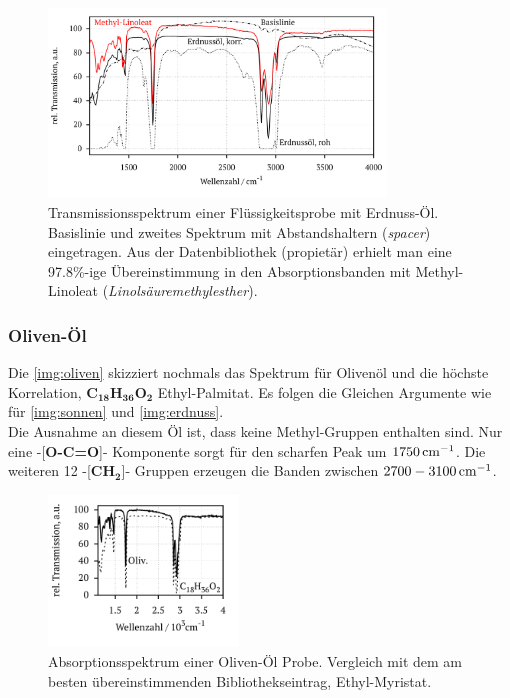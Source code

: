 \documentclass[a4paper,10pt,twocolumn]{article}
\newcommand{\tilt}[1]{\textit{#1}}
\newcommand{\fett}[1]{\textbf{#1}}
\begin{document}
			\begin{figure}
				\centering
				\includegraphics[width=0.8\textwidth]{Gruppe2A/erdnuss.pdf}
				\caption{Transmissionsspektrum einer Fl\"ussigkeitsprobe mit Erdnuss-\"Ol. Basislinie und zweites Spektrum mit Abstandshaltern (\tilt{spacer}) eingetragen. Aus der Datenbibliothek (propiet\"ar) erhielt man eine 97.8\%-ige \"Ubereinstimmung in den Absorptionsbanden mit Methyl-Linoleat (\tilt{Linols\"auremethylesther}).} 
				\label{img:erdnuss}
			\end{figure}

	\newpage

		\subsubsection*{Oliven-\"Ol}

		Die \autoref{img:oliven} skizziert nochmals das Spektrum f\"ur Oliven\"ol und die h\"ochste Korrelation, \fett{C}$_{\fett{18}}$\fett{H}$_{\fett{36}}$\fett{O}$_{\fett{2}}$ Ethyl-Palmitat. Es folgen die Gleichen Argumente wie f\"ur \autoref{img:sonnen} und \autoref{img:erdnuss}.\\
		Die Ausnahme an diesem \"Ol ist, dass keine Methyl-Gruppen enthalten sind. Nur eine -[\fett{O-C=O}]- Komponente sorgt f\"ur den scharfen Peak um $\unit[1750]{cm^{-1}}$. Die weiteren 12 -[\fett{CH}$_{\fett{2}}$]- Gruppen erzeugen die Banden zwischen $\unit[2700-3100]{cm^{-1}}$.

	\newpage

				\begin{figure}[H]
					\centering
					\includegraphics[width=0.45\textwidth]{Gruppe2A/oliven.pdf}
					\caption{Absorptionsspektrum einer Oliven-\"Ol Probe. Vergleich mit dem am besten \"ubereinstimmenden Bibliothekseintrag, Ethyl-Myristat.}
					\label{img:oliven}
				\end{figure}
\end{document}
